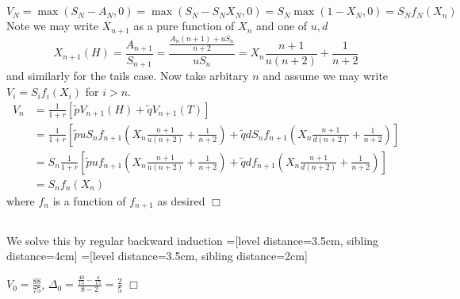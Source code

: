 \documentclass{article}
\begin{document}
\subsection{}
$$V_N = \max(S_N - A_N, 0) = \max(S_N - S_NX_N, 0) = S_N \max(1 - X_N, 0) = S_N f_N(X_n)$$
Note we may write $X_{n+1}$ as a pure function of $X_n$ and one of $u,d$
$$X_{n+1}(H) = \frac{A_{n+1}}{S_{n+1}} = \frac{\frac{A_n(n+1) + uS_n}{n+2}}{uS_n} = X_n \frac{n+1}{u(n+2)} + \frac{1}{n+2}$$
and similarly for the tails case. Now take arbitary $n$ and assume we may write $V_i = S_i f_i(X_i)$ for $i > n$.
\begin{equation*}
\begin{split}
V_n &= \frac{1}{1+r} \left[ \tilde{p} V_{n+1}(H) + \tilde{q} V_{n+1}(T) \right]\\
&= \frac{1}{1+r} \left[ \tilde{p} u S_n f_{n+1}(X_n \frac{n+1}{u(n+2)} + \frac{1}{n+2}) + \tilde{q} d S_n f_{n+1}(X_n \frac{n+1}{d(n+2)} + \frac{1}{n+2}) \right]\\
&= S_n \frac{1}{1+r}\left[ \tilde{p} u f_{n+1}(X_n \frac{n+1}{u(n+2)} + \frac{1}{n+2}) + \tilde{q} d f_{n+1}(X_n \frac{n+1}{d(n+2)} + \frac{1}{n+2}) \right]\\
&= S_n f_n(X_n)
\end{split}
\end{equation*}
where $f_n$ is a function of $f_{n+1}$ as desired $\Box$

\subsection{}
We solve this by regular backward induction
=[level distance=3.5cm, sibling distance=4cm]
=[level distance=3.5cm, sibling distance=2cm]
\begin{center}
\end{center}
$V_0 = \frac{88}{75}$, $\Delta_0 = \frac{\frac{40}{15} - \frac{4}{15}}{8 - 2} = \frac{2}{5}$ $\Box$
\end{document}
